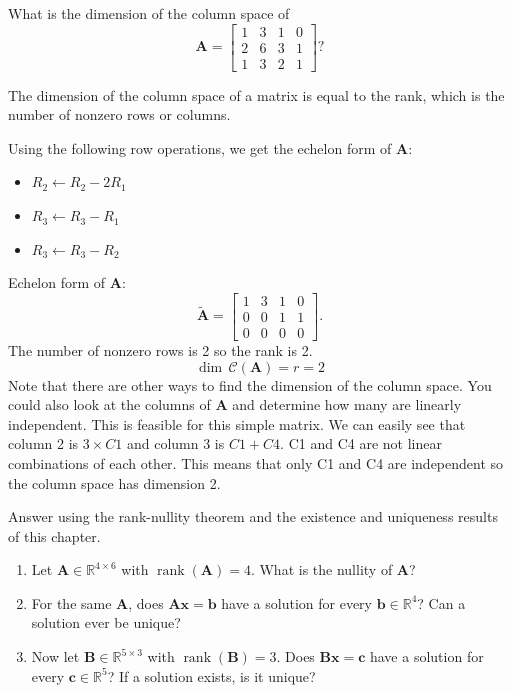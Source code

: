 \begin{exercise} %
    What is the dimension of the column space of
    \[
        \mathbf{A} = \begin{bmatrix}
            1 & 3 & 1 & 0 \\
            2 & 6 & 3 & 1 \\
            1 & 3 & 2 & 1
        \end{bmatrix}?
    \]
\end{exercise}

\begin{solution}
    The dimension of the column space of a matrix is equal to the rank, which is the number of nonzero rows or columns. 
    
    Using the following row operations, we get the echelon form of $\mathbf{A}$:
    \begin{itemize}
        \item $R_2 \leftarrow R_2 - 2R_1$
        \item $R_3 \leftarrow R_3 - R_1$
        \item $R_3 \leftarrow R_3 - R_2$
    \end{itemize}
    Echelon form of $\mathbf{A}$:
    \[
        \tilde{\mathbf{A}} = \begin{bmatrix}
            1 & 3 & 1 & 0 \\
            0 & 0 & 1 & 1 \\
            0 & 0 & 0 & 0
        \end{bmatrix}.
    \]
    The number of nonzero rows is 2 so the rank is 2.
    \[
        \dim\,\mathcal{C}(\mathbf{A}) = r = 2
    \]
    Note that there are other ways to find the dimension of the column space. You could also look at the columns of $\mathbf{A}$ and determine how many are linearly independent. This is feasible for this simple matrix. We can easily see that column 2 is $3 \times C1$ and column 3 is $C1+C4$. C1 and C4 are not linear combinations of each other. This means that only C1 and C4 are independent so the column space has dimension 2.
\end{solution}

\begin{exercise} %
    Answer using the rank-nullity theorem and the existence and uniqueness results of this chapter.
    \begin{enumerate}[label=(\alph*)]
        \item Let $\mathbf{A} \in \mathbb{R}^{4 \times 6}$ with $\operatorname{rank}(\mathbf{A}) = 4$. What is the nullity of $\mathbf{A}$?
        \item For the same $\mathbf{A}$, does $\mathbf{A}\mathbf{x} = \mathbf{b}$ have a solution for every $\mathbf{b} \in \mathbb{R}^4$? Can a solution ever be unique?
        \item Now let $\mathbf{B} \in \mathbb{R}^{5 \times 3}$ with $\operatorname{rank}(\mathbf{B}) = 3$. Does $\mathbf{B}\mathbf{x} = \mathbf{c}$ have a solution for every $\mathbf{c} \in \mathbb{R}^5$? If a solution exists, is it unique?
    \end{enumerate}
\end{exercise}

